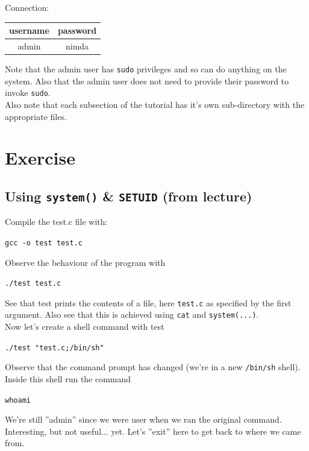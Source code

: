 \documentclass{article}
\begin{document}
\noindent Connection:
\begin{table}[h!]
\centering
\label{tab:my-table}
\begin{tabular}{c|c}
\textbf{username} & \textbf{password} \\ \hline
admin          & nimda         
\end{tabular}
\end{table}

\noindent Note that the admin user has  \lstinline{sudo} privileges and so can do anything on the system. Also that the admin user does not need to provide their password to invoke \lstinline{sudo}.\\

\noindent Also note that each subsection of the tutorial has it’s own sub-directory with the
appropriate files.


\section{Exercise}
\subsection{Using \lstinline{system()} \& \lstinline{SETUID} (from lecture)}
Compile the test.c file with:
\begin{center}
    \lstinline{gcc -o test test.c}
\end{center}
\noindent Observe the behaviour of the program with
\begin{center}
    \lstinline{./test test.c}
\end{center}
\noindent See that test prints the contents of a file, here \lstinline{test.c} as specified by the
first argument. Also see that this is achieved using \lstinline{cat} and \lstinline{system(...)}.\\


\noindent Now let’s create a shell command with test
\begin{center}
    \lstinline{./test "test.c;/bin/sh"}
\end{center}

\noindent Observe that the command prompt has changed (we’re in a new \lstinline{/bin/sh} shell). Inside this shell run the command

\begin{center}
    \lstinline{whoami}
\end{center}
We’re still ”admin” since we were user when we ran the original command.
Interesting, but not useful... yet. Let’s ”exit” here to get back to where we
came from.\\
\end{document}
